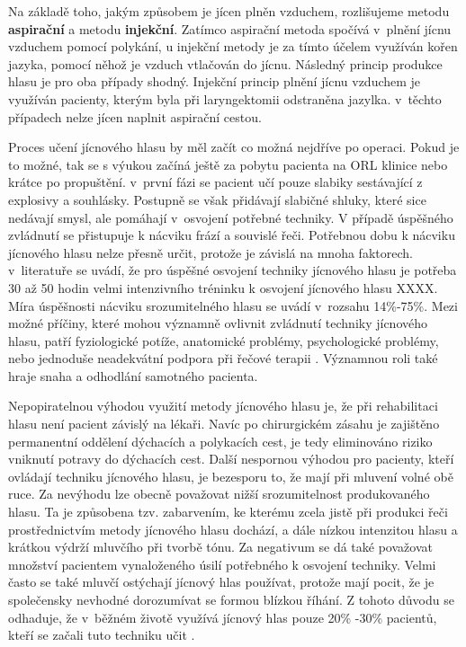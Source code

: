 Na základě toho, jakým způsobem je jícen plněn vzduchem, rozlišujeme metodu \textbf{aspirační} a metodu \textbf{injekční}. Zatímco aspirační metoda spočívá v~plnění jícnu vzduchem pomocí polykání, u injekční metody je za tímto účelem využíván kořen jazyka, pomocí něhož je vzduch vtlačován do jícnu. Následný princip produkce hlasu je pro oba případy shodný. Injekční princip plnění jícnu vzduchem je využíván pacienty, kterým byla
při laryngektomii odstraněna jazylka. v~těchto případech nelze jícen naplnit aspirační cestou.

Proces učení jícnového hlasu by měl začít co možná nejdříve po operaci. Pokud
je to možné, tak se s výukou začíná ještě za pobytu pacienta na ORL klinice
nebo krátce po propuštění. v~první fázi se pacient učí pouze slabiky
sestávající z explosivy a souhlásky. Postupně se však přidávají slabičné
shluky, které sice nedávají smysl, ale pomáhají v~osvojení potřebné techniky.
V případě úspěšného zvládnutí se přistupuje k nácviku frází a souvislé řeči.
Potřebnou dobu k nácviku jícnového hlasu nelze přesně určit, protože je
závislá na mnoha faktorech. v~literatuře se uvádí, že pro úspěšné osvojení techniky jícnového hlasu je potřeba 30 až 50 hodin velmi intenzivního tréninku k osvojení jícnového hlasu XXXX. Míra úspěšnosti nácviku srozumitelného hlasu se uvádí v~rozsahu 14\%-75\%. %
Mezi možné příčiny, které mohou významně ovlivnit zvládnutí techniky jícnového hlasu, patří
fyziologické potíže, anatomické problémy, psychologické problémy, nebo jednoduše
neadekvátní podpora při řečové terapii \cite{Brown2003}. Významnou roli také
hraje snaha a odhodlání samotného pacienta.

Nepopiratelnou výhodou využití metody jícnového hlasu je, že při rehabilitaci hlasu není pacient závislý na lékaři. Navíc po chirurgickém zásahu je zajištěno permanentní oddělení dýchacích a
polykacích cest, je tedy eliminováno riziko vniknutí potravy do dýchacích cest.
Další nespornou výhodou pro pacienty, kteří ovládají techniku jícnového hlasu, je bezesporu to, že mají při mluvení
volné obě ruce. Za nevýhodu lze obecně považovat nižší srozumitelnost produkovaného hlasu.
Ta je způsobena tzv.  zabarvením, ke kterému zcela jistě při produkci řeči prostřednictvím metody jícnového hlasu  dochází, a dále nízkou intenzitou hlasu a krátkou výdrží mluvčího při tvorbě tónu. Za negativum se dá také považovat množství pacientem vynaloženého úsilí potřebného k osvojení
techniky. Velmi často se také mluvčí ostýchají jícnový hlas používat, protože
mají pocit, že je společensky nevhodné dorozumívat se formou blízkou říhání. Z
tohoto důvodu se odhaduje, že v~běžném životě využívá jícnový hlas pouze 20\% -30\%
pacientů, kteří se začali tuto techniku učit \cite{Hradecka2007}.

